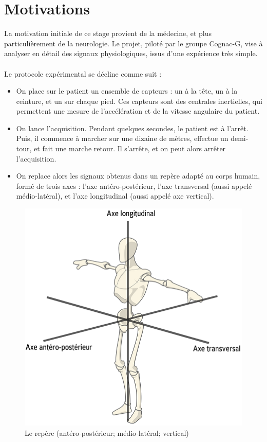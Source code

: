 \documentclass[french,12pt,notitlepage]{report}
\begin{document}
	\section{Motivations}
		La motivation initiale de ce stage provient de la médecine, et plus particulièrement de la neurologie. Le projet, piloté par le groupe Cognac-G, vise à analyser en détail des signaux physiologiques, issus d'une expérience très simple.
	\\ \\
	Le protocole expérimental se décline comme suit :
	\begin{itemize}
		\item On place sur le patient un ensemble de capteurs : un à la tête, un à la ceinture, et un sur chaque pied. Ces capteurs sont des centrales inertielles, qui permettent une mesure de l'accélération et de la vitesse angulaire du patient.
		\item On lance l'acquisition. Pendant quelques secondes, le patient est à l'arrêt. Puis, il commence à marcher sur une dizaine de mètres, effectue un demi-tour, et fait une marche retour. Il s'arrête, et on peut alors arrêter l'acquisition.
		\item On replace alors les signaux obtenus dans un repère adapté au corps humain, formé de trois axes : l'axe antéro-postérieur, l'axe transversal (aussi appelé médio-latéral), et l'axe longitudinal (aussi appelé axe vertical).
	\end{itemize}
	
	\begin{figure}[!h]
		\includegraphics[scale=0.3]{axis.png}
		\caption{Le repère (antéro-postérieur; médio-latéral; vertical)}
		\label{axis}
	\end{figure}
		
\end{document}
